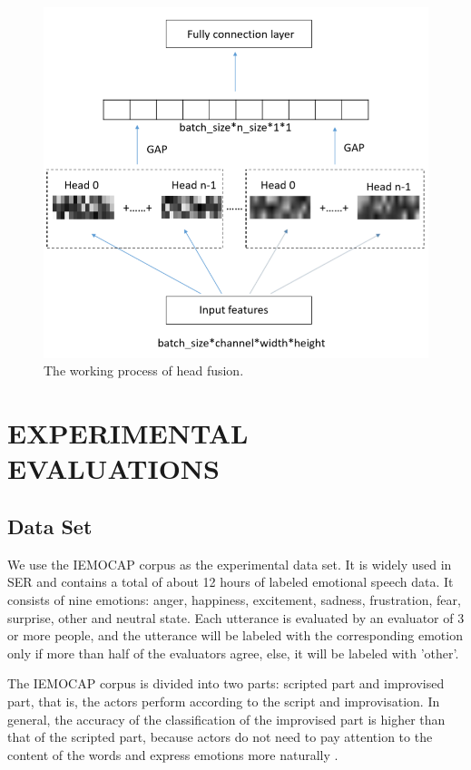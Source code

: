 \documentclass[10pt, conference, compsocconf]{IEEEtran}
\begin{document}
\begin{figure}[h]
	\centering
	\includegraphics[width=0.95\linewidth]{pic/head_fusion}
	\caption{The working process of head fusion.}
	\label{headFusion}
\end{figure}

\section{EXPERIMENTAL EVALUATIONS}
\subsection{Data Set}
We use the IEMOCAP corpus as the experimental data set. It is widely used in SER and contains a total of about 12 hours of labeled emotional speech data. It consists of nine emotions: anger, happiness, excitement, sadness, frustration, fear, surprise, other and neutral state. Each utterance is evaluated by an evaluator of 3 or more people, and the utterance will be labeled with the corresponding emotion only if more than half of the evaluators agree, else, it will be labeled with 'other'. 

The IEMOCAP corpus is divided into two parts: scripted part and improvised part, that is, the actors perform according to the script and improvisation. In general, the accuracy of the classification of the improvised part is higher than that of the scripted part, because actors do not need to pay attention to the content of the words and express emotions more naturally \cite{li2018attention,tarantino2019self}.
\end{document}
